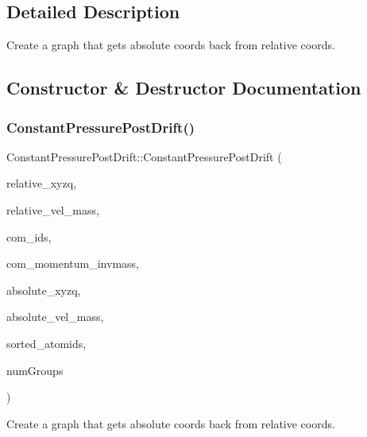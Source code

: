 \subsection{Detailed Description}
Create a graph that gets absolute coords back from relative coords. 



\subsection{Constructor \& Destructor Documentation}
\hypertarget{classConstantPressurePostDrift_ac04e5c4bcbd6f48169085138a157c2e8}{}\label{classConstantPressurePostDrift_ac04e5c4bcbd6f48169085138a157c2e8} 
\subsubsection{\texorpdfstring{Constant\+Pressure\+Post\+Drift()}{ConstantPressurePostDrift()}}
{\footnotesize\ttfamily Constant\+Pressure\+Post\+Drift\+::\+Constant\+Pressure\+Post\+Drift (\begin{DoxyParamCaption}\item[{const double4 $\ast$\+\_\+\+\_\+restrict\+\_\+\+\_\+}]{relative\+\_\+xyzq,  }\item[{const double4 $\ast$\+\_\+\+\_\+restrict\+\_\+\+\_\+}]{relative\+\_\+vel\+\_\+mass,  }\item[{const \hyperlink{structComID__t}{Com\+I\+D\+\_\+t} $\ast$\+\_\+\+\_\+restrict\+\_\+\+\_\+}]{com\+\_\+ids,  }\item[{const double4 $\ast$\+\_\+\+\_\+restrict\+\_\+\+\_\+}]{com\+\_\+momentum\+\_\+invmass,  }\item[{double4 $\ast$\+\_\+\+\_\+restrict\+\_\+\+\_\+}]{absolute\+\_\+xyzq,  }\item[{double4 $\ast$\+\_\+\+\_\+restrict\+\_\+\+\_\+}]{absolute\+\_\+vel\+\_\+mass,  }\item[{const int $\ast$}]{sorted\+\_\+atomids,  }\item[{int}]{num\+Groups }\end{DoxyParamCaption})}



Create a graph that gets absolute coords back from relative coords. 


